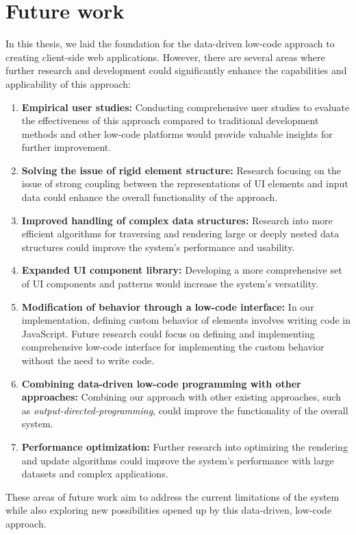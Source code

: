 \section{Future work}
In this thesis, we laid the foundation for the data-driven low-code approach to creating client-side web applications.
However, there are several areas where further research and development could significantly enhance the capabilities and applicability of this approach:
\begin{enumerate}
	\item \textbf{Empirical user studies:} Conducting comprehensive user studies to evaluate the effectiveness of this approach compared to traditional development methods and other low-code platforms would provide valuable insights for further improvement.
	\item \textbf{Solving the issue of rigid element structure:} Research focusing on the issue of strong coupling between the representations of UI elements and input data could enhance the overall functionality of the approach.
	\item \textbf{Improved handling of complex data structures:} Research into more efficient algorithms for traversing and rendering large or deeply nested data structures could improve the system's performance and usability.
	\item \textbf{Expanded UI component library:} Developing a more comprehensive set of UI components and patterns would increase the system's versatility.
	\item \textbf{Modification of behavior through a low-code interface:} In our implementation, defining custom behavior of elements involves writing code in JavaScript.
	      Future research could focus on defining and implementing comprehensive low-code interface for implementing the custom behavior without the need to write code.
	\item \textbf{Combining data-driven low-code programming with other approaches:} Combining our approach with other existing approaches, such as \emph{output-directed-programming}\cite{output-directed-programming}, could improve the functionality of the overall system.
	\item \textbf{Performance optimization:} Further research into optimizing the rendering and update algorithms could improve the system's performance with large datasets and complex applications.
\end{enumerate}
These areas of future work aim to address the current limitations of the system while also exploring new possibilities opened up by this data-driven, low-code approach.
